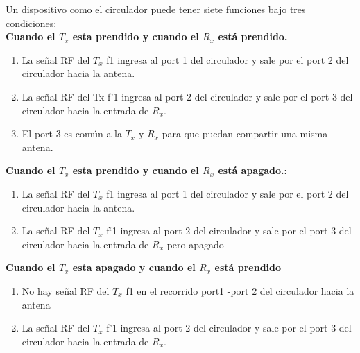 \documentclass[
	12pt, %
	fleqn, %
	a4paper, %
]{LegrandOrangeBook}
\begin{document}
\begin{example}
Un dispositivo como el circulador puede tener siete funciones bajo tres condiciones:\\
\textbf{Cuando el $T_x$ esta prendido y cuando el $R_x$ está prendido.}
\begin{enumerate}
\item La señal RF del $T_x$ f1 ingresa al port 1 del circulador y sale por el port 2 del circulador
hacia la antena.
\item La señal RF del Tx f'1 ingresa al port 2 del circulador y sale por el port 3 del circulador
hacia la entrada de $R_x$.
\item El port 3 es común a la $T_x$ y $R_x$ para que puedan compartir una misma antena.
\end{enumerate}
\textbf{Cuando el $T_x$ esta prendido y cuando el $R_x$ está apagado.}:
\begin{enumerate}
\item La señal RF del $T_x$ f1 ingresa al port 1 del circulador y sale por el port 2 del circulador
hacia la antena.
\item La señal RF del $T_x$ f`1 ingresa al port 2 del circulador y sale por el port 3 del circulador
hacia la entrada de $R_x$ pero apagado
\end{enumerate}
\textbf{Cuando el $T_x$ esta apagado y cuando el $R_x$ está prendido}
\begin{enumerate}
\item No hay señal RF del $T_x$ f1 en el recorrido port1 -port 2 del circulador hacia la antena
\item La señal RF del $T_x$ f'1 ingresa al port 2 del circulador y sale por el port 3 del circulador hacia
la entrada de $R_x$.
\end{enumerate}
\end{example}
\end{document}
